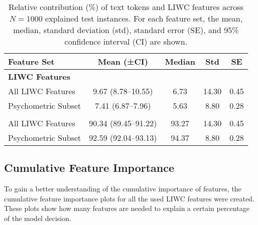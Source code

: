 \begin{table}[h!]
\centering
\caption[Relative contribution of text tokens and LIWC features.]{Relative contribution (\%) of text tokens and LIWC features across $N = 1000$ explained test instances. For each feature set, the mean, median, standard deviation (std), standard error (SE), and 95\% confidence interval (CI) are shown.}
\label{tab:liwc_vs_tokens}
\begin{tabular}{lcccc}
\toprule
\textbf{Feature Set} & \textbf{Mean (±CI)} & \textbf{Median} & \textbf{Std} & \textbf{SE} \\
\midrule
\multicolumn{5}{l}{\textbf{LIWC Features}} \\
All LIWC Features     & 9.67 (8.78–10.55) & 6.73 & 14.30 & 0.45 \\
Psychometric Subset   & 7.41 (6.87–7.96)  & 5.63 &  8.80 & 0.28 \\
\addlinespace[0.3em]
\midrule
\multicolumn{5}{l}{\textbf{Text Tokens}} \\
All LIWC Features     & 90.34 (89.45–91.22) & 93.27 & 14.30 & 0.45 \\
Psychometric Subset   & 92.59 (92.04–93.13) & 94.37 &  8.80 & 0.28 \\
\bottomrule
\end{tabular}
\end{table}


\subsection{Cumulative Feature Importance}

To gain a better understanding of the cumulative importance of features, the cumulative feature importance plots for all the used LIWC features were created. These plots show how many features are needed to explain a certain percentage of the model decision.

